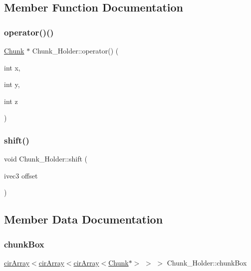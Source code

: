 \subsection{Member Function Documentation}
\mbox{\label{classChunk__Holder_aea3fa247a63abc4ff78af82f901840df}} 
\subsubsection{\texorpdfstring{operator()()}{operator()()}}
{\footnotesize\ttfamily \mbox{\hyperlink{classChunk}{Chunk}} $\ast$ Chunk\+\_\+\+Holder\+::operator() (\begin{DoxyParamCaption}\item[{int}]{x,  }\item[{int}]{y,  }\item[{int}]{z }\end{DoxyParamCaption})}

\mbox{\label{classChunk__Holder_a383070a12c061c7a1a989af13adcef56}} 
\subsubsection{\texorpdfstring{shift()}{shift()}}
{\footnotesize\ttfamily void Chunk\+\_\+\+Holder\+::shift (\begin{DoxyParamCaption}\item[{ivec3}]{offset }\end{DoxyParamCaption})}



\subsection{Member Data Documentation}
\mbox{\label{classChunk__Holder_a50d70dce3408437c449b72ab85bfa435}} 
\subsubsection{\texorpdfstring{chunk\+Box}{chunkBox}}
{\footnotesize\ttfamily \mbox{\hyperlink{classcirArray}{cir\+Array}}$<$\mbox{\hyperlink{classcirArray}{cir\+Array}}$<$\mbox{\hyperlink{classcirArray}{cir\+Array}}$<$\mbox{\hyperlink{classChunk}{Chunk}}$\ast$$>$ $>$ $>$ Chunk\+\_\+\+Holder\+::chunk\+Box\hspace{0.3cm}{\ttfamily [private]}}

